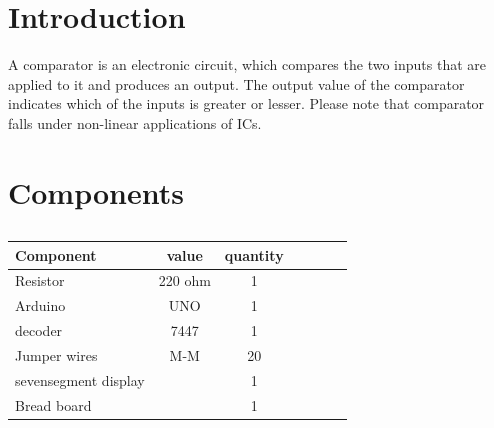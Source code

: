 \documentclass[10pt, a4paper]{article}
\title{\mytitle}
\author{\myauthor\hspace{1em}\\\contact\\IITH\hspace{0.5em}-\hspace{0.5em}\mymodule}
\date{}
\begin{document}
	\maketitle
	\tableofcontents
	\begin{abstract}
Design a sequential circuit that take(A3 A2 A1 A0 ) and (B3 B2 B1 B0) compares both A and B.The output should be 1.A$<$B, 2.A$>$B, 3.A=B on seven segment display.
	\end{abstract}
    \section{Introduction}
    A comparator is an electronic circuit, which compares the two inputs that are applied to it and produces an output. The output value of the comparator indicates which of the inputs is greater or lesser. Please note that comparator falls under non-linear applications of ICs.
	\section{Components}
	
\begin{table}[htbp]
 \begin{center}
    \begin{tabular}{|l|c|c|c|c|c|c} \hline \textbf{Component}
  & \textbf{value} & \textbf{quantity} \\
 \hline
Resistor & 220 ohm & 1 \\ \hline
Arduino & UNO & 1 \\ \hline
decoder & 7447 & 1  \\ \hline
Jumper wires & M-M & 20\\ \hline
sevensegment display &  & 1 \\ \hline
Bread board &  & 1 \\ \hline
\end{tabular}   
\end{center}
\caption{\label{table:table} }
\end{table}
\end{document}
